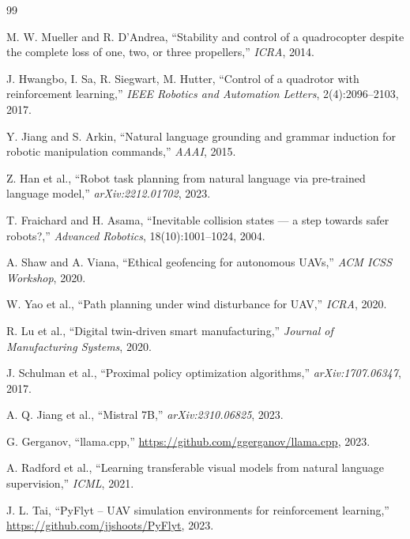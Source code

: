 \documentclass[10pt,twocolumn]{article}
\begin{document}

\begin{thebibliography}{99}

M. W. Mueller and R. D'Andrea,
``Stability and control of a quadrocopter despite the complete loss of one, two, or three propellers,''
\textit{ICRA}, 2014.

J. Hwangbo, I. Sa, R. Siegwart, M. Hutter,
``Control of a quadrotor with reinforcement learning,''
\textit{IEEE Robotics and Automation Letters}, 2(4):2096--2103, 2017.

Y. Jiang and S. Arkin,
``Natural language grounding and grammar induction for robotic manipulation commands,''
\textit{AAAI}, 2015.

Z. Han et al.,
``Robot task planning from natural language via pre-trained language model,''
\textit{arXiv:2212.01702}, 2023.

T. Fraichard and H. Asama,
``Inevitable collision states — a step towards safer robots?,''
\textit{Advanced Robotics}, 18(10):1001--1024, 2004.

A. Shaw and A. Viana,
``Ethical geofencing for autonomous UAVs,''
\textit{ACM ICSS Workshop}, 2020.

W. Yao et al.,
``Path planning under wind disturbance for UAV,''
\textit{ICRA}, 2020.

R. Lu et al.,
``Digital twin-driven smart manufacturing,''
\textit{Journal of Manufacturing Systems}, 2020.

J. Schulman et al.,
``Proximal policy optimization algorithms,''
\textit{arXiv:1707.06347}, 2017.

A. Q. Jiang et al.,
``Mistral 7B,''
\textit{arXiv:2310.06825}, 2023.

G. Gerganov,
``llama.cpp,''
\url{https://github.com/ggerganov/llama.cpp}, 2023.

A. Radford et al.,
``Learning transferable visual models from natural language supervision,''
\textit{ICML}, 2021.

J. L. Tai,
``PyFlyt -- UAV simulation environments for reinforcement learning,''
\url{https://github.com/jjshoots/PyFlyt}, 2023.

\end{thebibliography}
\end{document}
